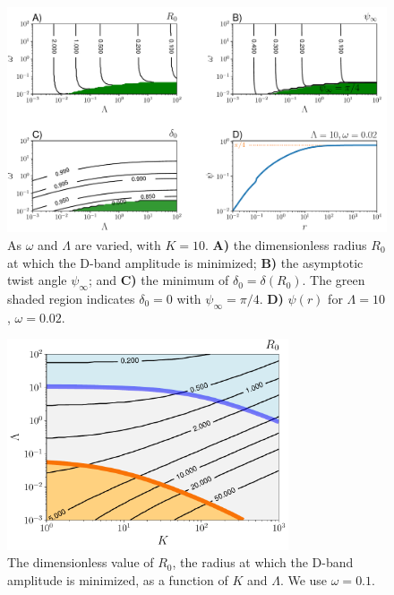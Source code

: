\documentclass[twoside,twocolumn,9pt]{article}
\begin{document}
\begin{figure}[t!] %
\centering
  \includegraphics[width=17.1cm]{figure7.pdf}
  \caption{As $\omega$ and $\Lambda$ are varied, with $K=10$. \textbf{A)} the dimensionless radius $R_0$ at which the D-band amplitude is minimized; \textbf{B)} the asymptotic twist angle $\psi_\infty$; and \textbf{C)} the minimum of $\delta_0=\delta(R_0)$. The green shaded region indicates $\delta_0 = 0$ with $\psi_\infty=\pi/4$. \textbf{D)} $\psi(r)$ for $\Lambda=10$, $\omega=0.02$.}
  \label{fig:omegadependence}
\end{figure}

\begin{figure}[t!] %
\centering
  \includegraphics[width=8.3cm]{figure8.pdf}
  \caption{The dimensionless value of $R_0$, the radius at which the D-band amplitude is minimized, as a function of $K$ and $\Lambda$. We use  $\omega=0.1$.}
  \label{fig:r0location}
\end{figure}
\end{document}
